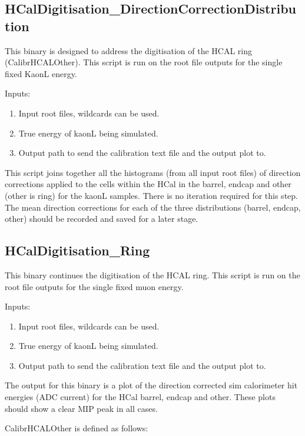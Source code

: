 \documentclass[11pt, oneside]{article}   	%
\begin{document}
\subsection{HCalDigitisation\_DirectionCorrectionDistribution}

This binary is designed to address the digitisation of the HCAL ring (CalibrHCALOther).  This script is run on the root file outputs for the single fixed KaonL energy.

Inputs:
\begin{enumerate}
\item Input root files, wildcards can be used.
\item True energy of kaonL being simulated.
\item Output path to send the calibration text file and the output plot to.
\end{enumerate}

This script joins together all the histograms (from all input root files) of direction corrections applied to the cells within the HCal in the barrel, endcap and other (other is ring) for the kaonL samples.  There is no iteration required for this step.  The mean direction corrections for each of the three distributions (barrel, endcap, other) should be recorded and saved for a later stage.

\subsection{HCalDigitisation\_Ring}

This binary continues the digitisation of the HCAL ring.  This script is run on the root file outputs for the single fixed muon energy.

Inputs:
\begin{enumerate}
\item Input root files, wildcards can be used.
\item True energy of kaonL being simulated.
\item Output path to send the calibration text file and the output plot to.
\end{enumerate}

The output for this binary is a plot of the direction corrected sim calorimeter hit energies (ADC current) for the HCal barrel, endcap and other.  These plots should show a clear MIP peak in all cases.

\vspace{1cm}

CalibrHCALOther is defined as follows:  
\end{document}

